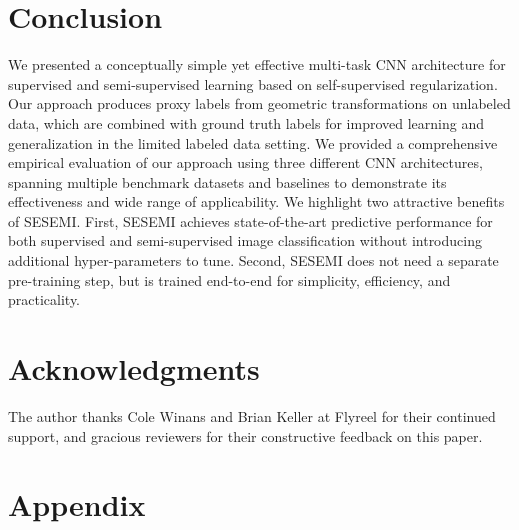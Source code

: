 \documentclass{article}
\begin{document}
\section{Conclusion}
We presented a conceptually simple yet effective multi-task CNN architecture for supervised and semi-supervised learning based on self-supervised regularization. Our approach produces proxy labels from geometric transformations on unlabeled data, which are combined with ground truth labels for improved learning and generalization in the limited labeled data setting. We provided a comprehensive empirical evaluation of our approach using three different CNN architectures, spanning multiple benchmark datasets and baselines to demonstrate its effectiveness and wide range of applicability. We highlight two attractive benefits of SESEMI. First, SESEMI achieves state-of-the-art predictive performance for both supervised and semi-supervised image classification without introducing additional hyper-parameters to tune. Second, SESEMI does not need a separate pre-training step, but is trained end-to-end for simplicity, efficiency, and practicality.

\section*{Acknowledgments}
The author thanks Cole Winans and Brian Keller at Flyreel for their continued support, and gracious reviewers for their constructive feedback on this paper.




\newpage

\section*{Appendix}

\appendix
\end{document}
